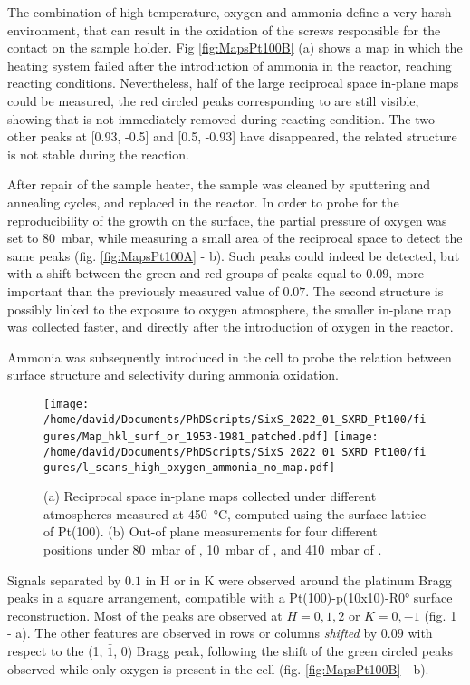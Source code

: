 The combination of high temperature, oxygen and ammonia define a very harsh environment, that can result in the oxidation of the screws responsible for the contact on the sample holder.
Fig \ref{fig:MapsPt100B} (a) shows a map in which the heating system failed after the introduction of ammonia in the reactor, reaching reacting conditions.
Nevertheless, half of the large reciprocal space in-plane maps could be measured, the red circled peaks corresponding to  are still visible, showing that  is not immediately removed during reacting condition.
The two other peaks at [0.93, -0.5] and [0.5, -0.93] have disappeared, the related structure is not stable during the reaction.

After repair of the sample heater, the sample was cleaned by sputtering and annealing cycles, and replaced in the reactor.
In order to probe for the reproducibility of the  growth on the surface, the partial pressure of oxygen was set to \qty{80}{\milli\bar}, while measuring a small area of the reciprocal space to detect the same peaks (fig. \ref{fig:MapsPt100A} - b).
Such peaks could indeed be detected, but with a shift between the green and red groups of peaks equal to $0.09$, more important than the previously measured value of $0.07$.
The second structure is possibly linked to the exposure to oxygen atmosphere, the smaller in-plane map was collected faster, and directly after the introduction of oxygen in the reactor.

Ammonia was subsequently introduced in the cell to probe the relation between surface structure and selectivity during ammonia oxidation.

\begin{figure}[!htb]
    \centering
    \texttt{[image: /home/david/Documents/PhDScripts/SixS\_2022\_01\_SXRD\_Pt100/figures/Map\_hkl\_surf\_or\_1953-1981\_patched.pdf]}
    \texttt{[image: /home/david/Documents/PhDScripts/SixS\_2022\_01\_SXRD\_Pt100/figures/l\_scans\_high\_oxygen\_ammonia\_no\_map.pdf]}
    \caption{
        (a) Reciprocal space in-plane maps collected under different atmospheres measured at \qty{450}{\degreeCelsius}, computed using the surface lattice of Pt(100).
        (b) Out-of plane measurements for four different positions under \qty{80}{\milli\bar} of , \qty{10}{\milli\bar} of , and \qty{410}{\milli\bar} of .
    }
    \label{fig:MapsAndLScansPt100HighOxAmmonia}
\end{figure}

Signals separated by $0.1$ in H or in K were observed around the platinum Bragg peaks in a square arrangement, compatible with a Pt(100)-p(10x10)-R\ang{0} surface reconstruction.
Most of the peaks are observed at $H={0,1,2}$ or $K={0, -1}$ (fig. \ref{fig:MapsAndLScansPt100HighOxAmmonia} - a).
The other features are observed in rows or columns \textit{shifted} by $0.09$ with respect to the (1, $\bar{1}$, 0) Bragg peak, following the shift of the green circled peaks observed while only oxygen is present in the cell (fig. \ref{fig:MapsPt100B} - b).

